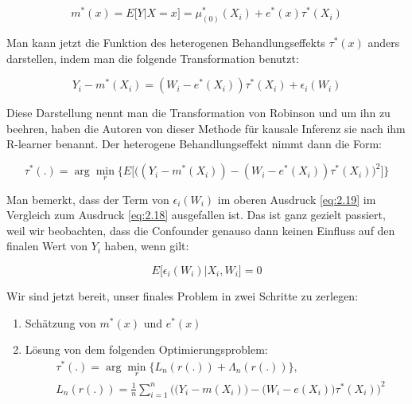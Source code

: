 \documentclass[12pt,a4paper,twoside]{scrartcl}
\numberwithin{equation}{section}
\begin{document}
\begin{equation}\label{eq:2.17}
  m^*(x) = E \big [Y |X=x \big ] =  \mu^*_{(0)}(X_i) + e^*(x)\tau^*(X_i) 
\end{equation}

\noindent
Man kann jetzt die Funktion des heterogenen Behandlungseffekts $\tau^*(x)$ anders darstellen, indem man die folgende Transformation benutzt:\par

\begin{equation}\label{eq:2.18}
 Y_i - m^*(X_i) = (W_i - e^*(X_i))\tau^*(X_i) + \epsilon_i(W_i) 
\end{equation}

\noindent
Diese Darstellung nennt man die Transformation von Robinson\cite{robinson1988root} und um ihn zu beehren, haben die Autoren von dieser Methode für kausale Inferenz sie nach ihm R-learner benannt. Der heterogene Behandlungseffekt nimmt dann die Form:\par 

\begin{equation}\label{eq:2.19}
 \tau^*(.) = \arg\min_r \bigg\{ E \bigg[ \bigg( ( Y_i - m^*(X_i)) - (W_i - e^*(X_i)) \tau^*(X_i)  \bigg)^2 \bigg] \bigg\}
\end{equation}

\noindent
Man bemerkt, dass der Term von $\epsilon_i(W_i)$ im oberen Ausdruck \ref{eq:2.19} im Vergleich zum Ausdruck \ref{eq:2.18} ausgefallen ist. Das ist ganz gezielt passiert, weil wir beobachten, dass die Confounder genauso dann keinen Einfluss auf den finalen Wert von $Y_i$ haben, wenn gilt:\par

\begin{equation}\label{eq:2.20}
	 E\big[\epsilon_i(W_i)|X_i,W_i\big] = 0
\end{equation}

\noindent
Wir sind jetzt bereit, unser finales Problem in zwei Schritte zu zerlegen:\par

\begin{enumerate}
  \item Schätzung von $m^*(x)$ und $e^*(x)$ 
  \item Lösung von dem folgenden Optimierungsproblem: 
  \begin{equation}\label{eq:2.21}
  \begin{split}
  	& \tau^*(.) = \arg\min_r \big\{ L_n(r(.))+ \Lambda_n(r(.)) \big\},\\
    &  L_n(r(.)) = \frac{1}{n}\sum_{i=1}^{n} \big( \big( Y_i - m(X_i)\big) - \big(W_i - e(X_i)\big) \tau^*(X_i)  \big)^2	
  \end{split}
  	\end{equation}
\end{enumerate}
\end{document}
